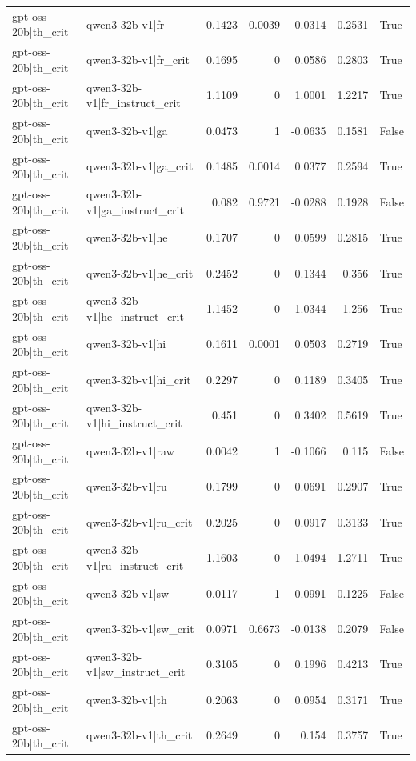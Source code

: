 \begin{table}
\begin{tabular}{l l r r r r l}
gpt-oss-20b|th_crit & qwen3-32b-v1|fr & 0.1423 & 0.0039 & 0.0314 & 0.2531 & True \\
gpt-oss-20b|th_crit & qwen3-32b-v1|fr_crit & 0.1695 & 0 & 0.0586 & 0.2803 & True \\
gpt-oss-20b|th_crit & qwen3-32b-v1|fr_instruct_crit & 1.1109 & 0 & 1.0001 & 1.2217 & True \\
gpt-oss-20b|th_crit & qwen3-32b-v1|ga & 0.0473 & 1 & -0.0635 & 0.1581 & False \\
gpt-oss-20b|th_crit & qwen3-32b-v1|ga_crit & 0.1485 & 0.0014 & 0.0377 & 0.2594 & True \\
gpt-oss-20b|th_crit & qwen3-32b-v1|ga_instruct_crit & 0.082 & 0.9721 & -0.0288 & 0.1928 & False \\
gpt-oss-20b|th_crit & qwen3-32b-v1|he & 0.1707 & 0 & 0.0599 & 0.2815 & True \\
gpt-oss-20b|th_crit & qwen3-32b-v1|he_crit & 0.2452 & 0 & 0.1344 & 0.356 & True \\
gpt-oss-20b|th_crit & qwen3-32b-v1|he_instruct_crit & 1.1452 & 0 & 1.0344 & 1.256 & True \\
gpt-oss-20b|th_crit & qwen3-32b-v1|hi & 0.1611 & 0.0001 & 0.0503 & 0.2719 & True \\
gpt-oss-20b|th_crit & qwen3-32b-v1|hi_crit & 0.2297 & 0 & 0.1189 & 0.3405 & True \\
gpt-oss-20b|th_crit & qwen3-32b-v1|hi_instruct_crit & 0.451 & 0 & 0.3402 & 0.5619 & True \\
gpt-oss-20b|th_crit & qwen3-32b-v1|raw & 0.0042 & 1 & -0.1066 & 0.115 & False \\
gpt-oss-20b|th_crit & qwen3-32b-v1|ru & 0.1799 & 0 & 0.0691 & 0.2907 & True \\
gpt-oss-20b|th_crit & qwen3-32b-v1|ru_crit & 0.2025 & 0 & 0.0917 & 0.3133 & True \\
gpt-oss-20b|th_crit & qwen3-32b-v1|ru_instruct_crit & 1.1603 & 0 & 1.0494 & 1.2711 & True \\
gpt-oss-20b|th_crit & qwen3-32b-v1|sw & 0.0117 & 1 & -0.0991 & 0.1225 & False \\
gpt-oss-20b|th_crit & qwen3-32b-v1|sw_crit & 0.0971 & 0.6673 & -0.0138 & 0.2079 & False \\
gpt-oss-20b|th_crit & qwen3-32b-v1|sw_instruct_crit & 0.3105 & 0 & 0.1996 & 0.4213 & True \\
gpt-oss-20b|th_crit & qwen3-32b-v1|th & 0.2063 & 0 & 0.0954 & 0.3171 & True \\
gpt-oss-20b|th_crit & qwen3-32b-v1|th_crit & 0.2649 & 0 & 0.154 & 0.3757 & True \\

\end{tabular}
\end{table}
